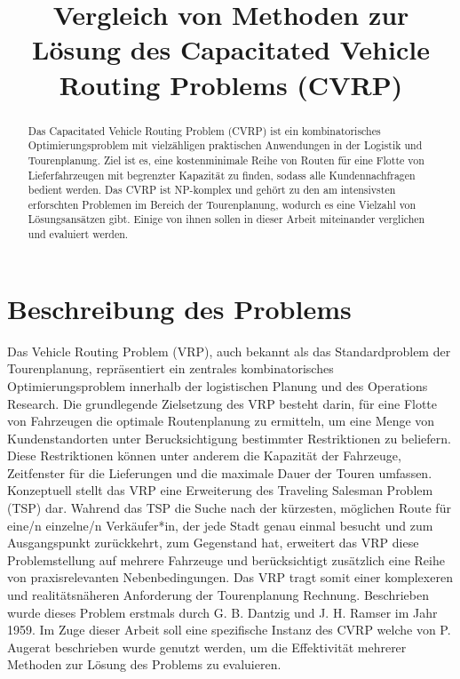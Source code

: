 \documentclass{IEEEtran}
\begin{document}
\title{Vergleich von Methoden zur Lösung des Capacitated Vehicle Routing Problems (CVRP)}

\maketitle

\begin{abstract}
    Das Capacitated Vehicle Routing Problem (CVRP) ist ein kombinatorisches 
    Optimierungsproblem mit vielzähligen praktischen Anwendungen 
    in der Logistik und Tourenplanung. Ziel ist es, eine kostenminimale Reihe von 
    Routen für eine Flotte von Lieferfahrzeugen mit begrenzter Kapazität zu finden, 
    sodass alle Kundennachfragen bedient werden. Das CVRP ist NP-komplex und gehört 
    zu den am intensivsten erforschten Problemen im Bereich der Tourenplanung, wodurch
    es eine Vielzahl von Lösungsansätzen gibt. Einige von ihnen sollen in dieser Arbeit
    miteinander verglichen und evaluiert werden.
\end{abstract}

\section{Beschreibung des Problems}
    Das Vehicle Routing Problem (VRP), auch bekannt als das Standardproblem der 
    Tourenplanung, repräsentiert ein zentrales kombinatorisches Optimierungsproblem 
    innerhalb der logistischen Planung und des Operations Research. Die grundlegende 
    Zielsetzung des VRP besteht darin, für eine Flotte von Fahrzeugen
    die optimale Routenplanung zu ermitteln, um eine Menge von Kundenstandorten unter 
    Berucksichtigung bestimmter Restriktionen zu beliefern. Diese Restriktionen 
    können unter anderem die Kapazität der Fahrzeuge, Zeitfenster für die Lieferungen 
    und die maximale Dauer der Touren umfassen. \newline\newline
    Konzeptuell stellt das VRP eine Erweiterung des Traveling Salesman Problem (TSP) 
    dar. Wahrend das TSP die Suche nach der kürzesten, möglichen Route für eine/n 
    einzelne/n Verkäufer*in, der jede Stadt genau einmal besucht und zum Ausgangspunkt 
    zurückkehrt, zum Gegenstand hat, erweitert das VRP diese Problemstellung auf mehrere 
    Fahrzeuge und berücksichtigt zusätzlich eine Reihe von praxisrelevanten 
    Nebenbedingungen. Das VRP tragt somit einer komplexeren und realitätsnäheren 
    Anforderung der Tourenplanung Rechnung. Beschrieben wurde dieses Problem erstmals 
    durch G. B. Dantzig und J. H. Ramser im Jahr 1959. \newline\newline
    Im Zuge dieser Arbeit soll eine spezifische Instanz des CVRP welche von 
    P. Augerat\cite{augerat} beschrieben wurde genutzt werden, um die Effektivität 
    mehrerer Methoden zur Lösung des Problems zu evaluieren. 
\end{document}
